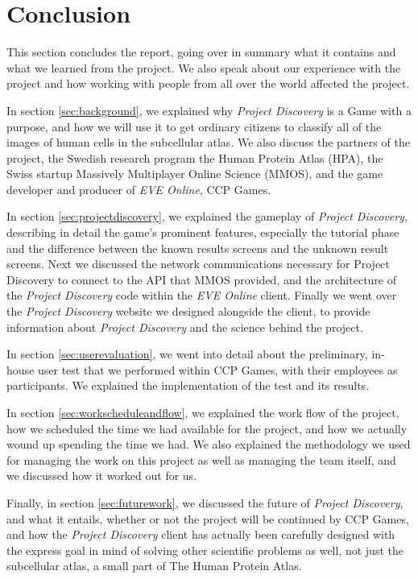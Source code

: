 \section{Conclusion}\label{sec:conclusion}

This section concludes the report, going over in summary what it contains and what we learned from the project. We also speak about our experience with the project and how working with people from all over the world affected the project. 

In section \ref{sec:background}, we explained why \emph{Project Discovery} is a Game with a purpose, and how we will use it to get ordinary citizens to classify all of the images of human cells in the subcellular atlas. We also discuss the partners of the project, the Swedish research program the Human Protein Atlas (HPA), the Swiss startup Massively Multiplayer Online Science (MMOS), and the game developer and producer of \emph{EVE Online}, CCP Games.

In section \ref{sec:projectdiscovery}, we explained the gameplay of \emph{Project Discovery}, describing in detail the game's prominent features, especially the tutorial phase and the difference between the known results screens and the unknown result screens. Next we discussed the network communications necessary for Project Discovery to connect to the API that MMOS provided, and the architecture of the \emph{Project Discovery} code within the \emph{EVE Online} client. Finally we went over the \emph{Project Discovery} website we designed alongside the client, to provide information about \emph{Project Discovery} and the science behind the project.

In section \ref{sec:userevaluation}, we went into detail about the preliminary, in-house user test that we performed within CCP Games, with their employees as participants. We explained the implementation of the test and its results.

In section \ref{sec:workscheduleandflow}, we explained the work flow of the project, how we scheduled the time we had available for the project, and how we actually wound up spending the time we had. We also explained the methodology we used for managing the work on this project as well as managing the team itself, and we discussed how it worked out for us.

Finally, in section \ref{sec:futurework}, we discussed the future of \emph{Project Discovery}, and what it entails, whether or not the project will be continued by CCP Games, and how the \emph{Project Discovery} client has actually been carefully designed with the express goal in mind of solving other scientific problems as well, not just the subcellular atlas, a small part of The Human Protein Atlas.

